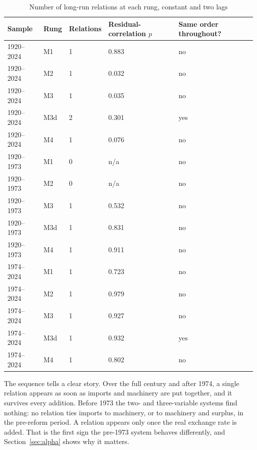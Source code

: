 \documentclass[11pt]{article}
\begin{document}
\begin{table}[H]
\centering
\caption{Number of long-run relations at each rung, constant and two lags}
\begin{tabular}{p{2.2cm}p{1.6cm}p{2.4cm}p{3.4cm}p{3.4cm}}
\toprule
\textbf{Sample} & \textbf{Rung} & \textbf{Relations} & \textbf{Residual-correlation} $p$ & \textbf{Same order throughout?} \\
\midrule
1920--2024 & M1 & 1 & 0.883 & no \\
1920--2024 & M2 & 1 & 0.032 & no \\
1920--2024 & M3 & 1 & 0.035 & no \\
1920--2024 & M3d & 2 & 0.301 & yes \\
1920--2024 & M4 & 1 & 0.076 & no \\
1920--1973 & M1 & 0 & n/a & no \\
1920--1973 & M2 & 0 & n/a & no \\
1920--1973 & M3 & 1 & 0.532 & no \\
1920--1973 & M3d & 1 & 0.831 & no \\
1920--1973 & M4 & 1 & 0.911 & no \\
1974--2024 & M1 & 1 & 0.723 & no \\
1974--2024 & M2 & 1 & 0.979 & no \\
1974--2024 & M3 & 1 & 0.927 & no \\
1974--2024 & M3d & 1 & 0.932 & yes \\
1974--2024 & M4 & 1 & 0.802 & no \\
\bottomrule
\end{tabular}
\end{table}

The sequence tells a clear story. Over the full century and after 1974, a single relation appears as soon as imports and machinery are put together, and it survives every addition. Before 1973 the two- and three-variable systems find nothing: no relation ties imports to machinery, or to machinery and surplus, in the pre-reform period. A relation appears only once the real exchange rate is added. That is the first sign the pre-1973 system behaves differently, and Section~\ref{sec:alpha} shows why it matters.
\end{document}
